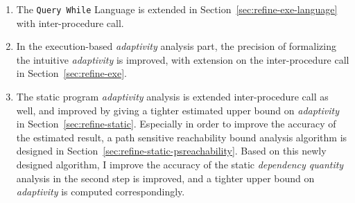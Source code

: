 \begin{enumerate}
   \item The {\tt Query While} Language is extended in Section~\ref{sec:refine-exe-language} with inter-procedure call.
   \item In the execution-based \emph{adaptivity} analysis part,
   the precision of formalizing the intuitive \emph{adaptivity} is improved, with extension on the
inter-procedure call in Section~\ref{sec:refine-exe}.
\item The static program \emph{adaptivity} analysis is extended inter-procedure call as well, 
and improved by
giving a tighter estimated upper bound on \emph{adaptivity} in Section~\ref{sec:refine-static}.
Especially in order to improve the accuracy of the estimated result, a
path sensitive reachability bound analysis algorithm is designed in Section~\ref{sec:refine-static-psreachability}.
Based on this newly designed algorithm,
I improve the accuracy of the static \emph{dependency quantity} analysis in the second step 
is improved, and a tighter upper bound on \emph{adaptivity} is computed correspondingly.
\end{enumerate}

